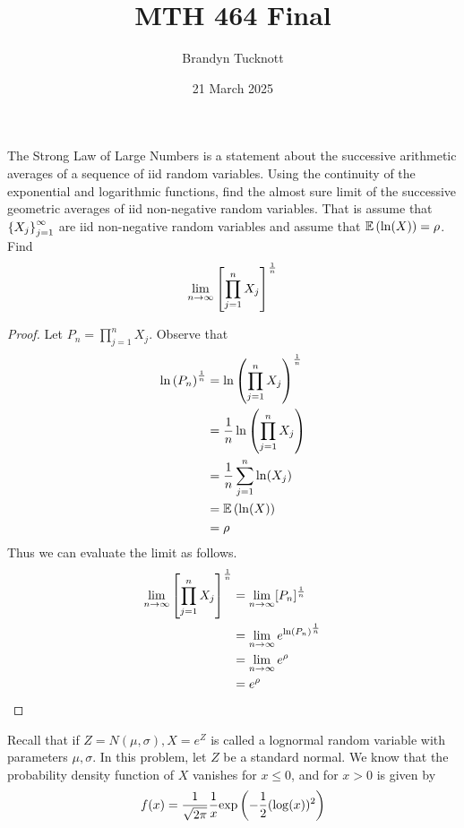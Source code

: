 \documentclass{exam}
\title{MTH 464 Final}
\author{Brandyn Tucknott}
\date{21 March 2025}
\begin{document}
\maketitle

\begin{questions}
    \question
The Strong Law of Large Numbers is a statement about the successive arithmetic averages of a sequence of iid random variables. Using the continuity of the exponential and
logarithmic functions, find the almost sure limit of the successive geometric averages of iid non-negative random variables. That is assume that $\left \{ X_j \right \}_{j = 1}^\infty$ are iid non-negative random variables and assume that $\mathbb{E}\left( \ln (X) \right) = \rho$. Find
$$\lim_{n \to \infty} \left[ \prod_{j = 1}^n X_j \right]^\frac{1}{n}$$
\begin{proof}
    Let $P_n = \prod_{j = 1}^n X_j$. Observe that
    \begin{align*}
        \ln\left( P_n \right)^\frac{1}{n} &= \ln\left( \prod_{j = 1}^n X_j \right)^\frac{1}{n} \\
        &= \frac{1}{n}\ln\left( \prod_{j = 1}^n X_j \right) \\
        &= \frac{1}{n}\sum_{j = 1}^n \ln (X_j) \\
        &= \mathbb{E}\left( \ln (X) \right) \\
        &= \rho
    \end{align*}
    Thus we can evaluate the limit as follows.
    \begin{align*}
        \lim_{n \to \infty} \left[ \prod_{j = 1}^n X_j \right]^\frac{1}{n} &= \lim_{n \to \infty} [P_n]^\frac{1}{n} \\
        &= \lim_{n\to\infty} e^{\ln \left( P_n \right)^\frac{1}{n}} \\
        &= \lim_{n\to\infty} e^\rho \\
        &= e^\rho
    \end{align*}
\end{proof}



\newpage
\question
Recall that if $Z = N(\mu, \sigma), X = e^Z$ is called a lognormal random variable with parameters $\mu, \sigma$. In this problem, let $Z$ be a standard normal. We know that the probability density function of $X$ vanishes for $x \leq 0$, and for $x > 0$ is given by
$$f(x) = \frac{1}{\sqrt{2\pi}}\frac{1}{x}\text{exp}\left( -\frac{1}{2}(\log (x))^2 \right)$$

\begin{parts}

\end{parts}
\end{questions}
\end{document}
